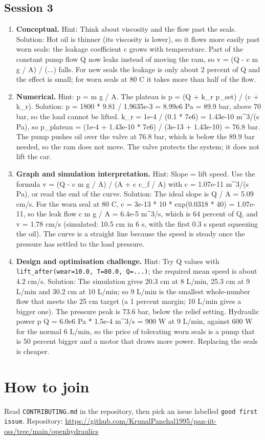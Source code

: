 \documentclass[11pt,a4paper]{article}
\begin{document}
\subsection*{Session 3}
\begin{enumerate}[nosep]
\item \textbf{Conceptual.} Hint: Think about viscosity and the flow past the seals. Solution: Hot oil is thinner (its viscosity is lower), so it flows more easily past worn seals: the leakage coefficient c grows with temperature. Part of the constant pump flow Q now leaks instead of moving the ram, so v = (Q - c m g / A) / (...) falls. For new seals the leakage is only about 2 percent of Q and the effect is small; for worn seals at 80 C it takes more than half of the flow.
\item \textbf{Numerical.} Hint: p = m g / A. The plateau is p = (Q + k\_r p\_set) / (c + k\_r). Solution: p = 1800 * 9.81 / 1.9635e-3 = 8.99e6 Pa = 89.9 bar, above 70 bar, so the load cannot be lifted. k\_r = 1e-4 / (0.1 * 7e6) = 1.43e-10 m\textasciicircum{}3/(s Pa), so p\_plateau = (1e-4 + 1.43e-10 * 7e6) / (3e-13 + 1.43e-10) = 76.8 bar. The pump pushes oil over the valve at 76.8 bar, which is below the 89.9 bar needed, so the ram does not move. The valve protects the system; it does not lift the car.
\item \textbf{Graph and simulation interpretation.} Hint: Slope = lift speed. Use the formula v = (Q - c m g / A) / (A + c c\_f / A) with c = 1.07e-11 m\textasciicircum{}3/(s Pa), or read the end of the curve. Solution: The ideal slope is Q / A = 5.09 cm/s. For the worn seal at 80 C, c = 3e-13 * 10 * exp(0.0318 * 40) = 1.07e-11, so the leak flow c m g / A = 6.4e-5 m\textasciicircum{}3/s, which is 64 percent of Q, and v = 1.78 cm/s (simulated: 10.5 cm in 6 s, with the first 0.3 s spent squeezing the oil). The curve is a straight line because the speed is steady once the pressure has settled to the load pressure.
\item \textbf{Design and optimisation challenge.} Hint: Try Q values with \texttt{lift\_after(wear=10.0, T=80.0, Q=...)}; the required mean speed is about 4.2 cm/s. Solution: The simulation gives 20.3 cm at 8 L/min, 25.3 cm at 9 L/min and 30.2 cm at 10 L/min; so 9 L/min is the smallest whole-number flow that meets the 25 cm target (a 1 percent margin; 10 L/min gives a bigger one). The pressure peak is 73.6 bar, below the relief setting. Hydraulic power p Q = 6.0e6 Pa * 1.5e-4 m\textasciicircum{}3/s = 900 W at 9 L/min, against 600 W for the normal 6 L/min, so the price of tolerating worn seals is a pump that is 50 percent bigger and a motor that draws more power. Replacing the seals is cheaper.
\end{enumerate}

\section{How to join}
Read \texttt{CONTRIBUTING.md} in the repository, then pick an issue labelled \texttt{good first issue}. Repository: \url{https://github.com/KrunalPanchal1995/pan-iit-oss/tree/main/openhydraulics}
\end{document}
